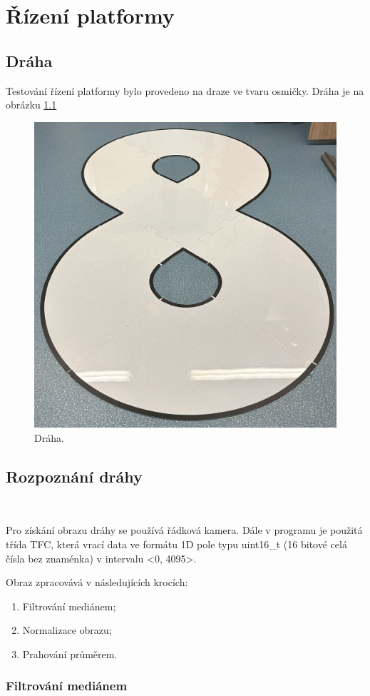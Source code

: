 \chapter{Řízení platformy}
\label{sec:PlatformControl}
\vspace{-20pt}

\section{Dráha}
Testování řízení platformy bylo provedeno na draze ve tvaru osmičky.
Dráha je na obrázku \ref{fig:Road}

\begin{figure}[!htbp]
    \centering
    \includegraphics[width = 0.5\linewidth]{Figures/Road.png}
    \caption{Dráha.}
    \label{fig:Road}
\end{figure}

\section{Rozpoznání dráhy}\

Pro získání obrazu dráhy se používá řádková kamera. Dále v programu
je použitá třída TFC\cite{draha}, která vrací data ve formátu 1D pole typu uint16\_t
(16 bitové celá čísla bez znaménka) v intervalu <0, 4095>.

Obraz zpracovává v následujících krocích:
\begin{enumerate}
    \item Filtrování mediánem;
    \item Normalizace obrazu;
    \item Prahování průměrem.
\end{enumerate}

\subsection{Filtrování mediánem}\

